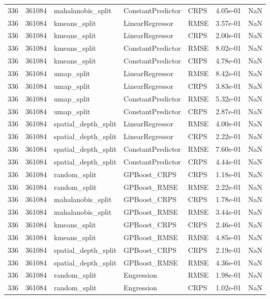 \begin{tabular}{rrlllrr}
336 & 361084 & mahalanobis\_split & ConstantPredictor & CRPS & 4.05e-01 & NaN \\
336 & 361084 & kmeans\_split & LinearRegressor & RMSE & 3.57e-01 & NaN \\
336 & 361084 & kmeans\_split & LinearRegressor & CRPS & 2.00e-01 & NaN \\
336 & 361084 & kmeans\_split & ConstantPredictor & RMSE & 8.02e-01 & NaN \\
336 & 361084 & kmeans\_split & ConstantPredictor & CRPS & 4.78e-01 & NaN \\
336 & 361084 & umap\_split & LinearRegressor & RMSE & 8.42e-01 & NaN \\
336 & 361084 & umap\_split & LinearRegressor & CRPS & 3.83e-01 & NaN \\
336 & 361084 & umap\_split & ConstantPredictor & RMSE & 5.32e-01 & NaN \\
336 & 361084 & umap\_split & ConstantPredictor & CRPS & 2.87e-01 & NaN \\
336 & 361084 & spatial\_depth\_split & LinearRegressor & RMSE & 4.00e-01 & NaN \\
336 & 361084 & spatial\_depth\_split & LinearRegressor & CRPS & 2.22e-01 & NaN \\
336 & 361084 & spatial\_depth\_split & ConstantPredictor & RMSE & 7.60e-01 & NaN \\
336 & 361084 & spatial\_depth\_split & ConstantPredictor & CRPS & 4.44e-01 & NaN \\
336 & 361084 & random\_split & GPBoost\_CRPS & CRPS & 1.18e-01 & NaN \\
336 & 361084 & random\_split & GPBoost\_RMSE & RMSE & 2.22e-01 & NaN \\
336 & 361084 & mahalanobis\_split & GPBoost\_CRPS & CRPS & 1.78e-01 & NaN \\
336 & 361084 & mahalanobis\_split & GPBoost\_RMSE & RMSE & 3.44e-01 & NaN \\
336 & 361084 & kmeans\_split & GPBoost\_CRPS & CRPS & 2.46e-01 & NaN \\
336 & 361084 & kmeans\_split & GPBoost\_RMSE & RMSE & 4.85e-01 & NaN \\
336 & 361084 & spatial\_depth\_split & GPBoost\_CRPS & CRPS & 2.19e-01 & NaN \\
336 & 361084 & spatial\_depth\_split & GPBoost\_RMSE & RMSE & 4.36e-01 & NaN \\
336 & 361084 & random\_split & Engression & RMSE & 1.98e-01 & NaN \\
336 & 361084 & random\_split & Engression & CRPS & 1.02e-01 & NaN \\

\end{tabular}
